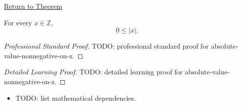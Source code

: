 \newpage
{}
\label{prf:absolute-value-nonnegative-on-z}

\begin{remark*}[Return]
\hyperref[thm:absolute-value-nonnegative-on-z]{Return to Theorem}
\end{remark*}

\begin{theorem*}
For every $x\in\mathbb{Z}$,
\[
0\le |x|.
\]
\end{theorem*}

\begin{proof}[Professional Standard Proof]
\LRAProofBodyStart
TODO: professional standard proof for absolute-value-nonnegative-on-z.
\end{proof}

\begin{proof}[Detailed Learning Proof]
\LRAProofBodyStart
TODO: detailed learning proof for absolute-value-nonnegative-on-z.
\end{proof}

\begin{remark*}
\end{remark*}

\begin{dependencies}
\begin{itemize}
  \item TODO: list mathematical dependencies.
\end{itemize}
\end{dependencies}

\clearpage
